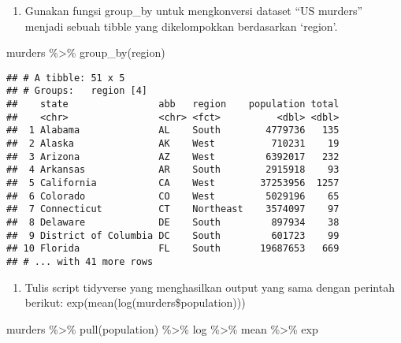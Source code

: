 \documentclass[
]{article}
\newenvironment{Shaded}{\begin{snugshade}}{\end{snugshade}}
\newcommand{\FunctionTok}[1]{\textcolor[rgb]{0.00,0.00,0.00}{#1}}
\newcommand{\NormalTok}[1]{#1}
\newcommand{\SpecialCharTok}[1]{\textcolor[rgb]{0.00,0.00,0.00}{#1}}
\providecommand{\tightlist}{%
  \setlength{\itemsep}{0pt}\setlength{\parskip}{0pt}}
\begin{document}
\begin{enumerate}
\def\labelenumi{\arabic{enumi}.}
\setcounter{enumi}{1}
\tightlist
\item
  Gunakan fungsi group\_by untuk mengkonversi dataset ``US murders''
  menjadi sebuah tibble yang dikelompokkan berdasarkan `region'.
\end{enumerate}

\begin{Shaded}
\begin{Highlighting}[]
\NormalTok{murders }\SpecialCharTok{\%\textgreater{}\%} \FunctionTok{group\_by}\NormalTok{(region)}
\end{Highlighting}
\end{Shaded}

\begin{verbatim}
## # A tibble: 51 x 5
## # Groups:   region [4]
##    state                abb   region    population total
##    <chr>                <chr> <fct>          <dbl> <dbl>
##  1 Alabama              AL    South        4779736   135
##  2 Alaska               AK    West          710231    19
##  3 Arizona              AZ    West         6392017   232
##  4 Arkansas             AR    South        2915918    93
##  5 California           CA    West        37253956  1257
##  6 Colorado             CO    West         5029196    65
##  7 Connecticut          CT    Northeast    3574097    97
##  8 Delaware             DE    South         897934    38
##  9 District of Columbia DC    South         601723    99
## 10 Florida              FL    South       19687653   669
## # ... with 41 more rows
\end{verbatim}

\begin{enumerate}
\def\labelenumi{\arabic{enumi}.}
\setcounter{enumi}{2}
\tightlist
\item
  Tulis script tidyverse yang menghasilkan output yang sama dengan
  perintah berikut: exp(mean(log(murders\$population)))
\end{enumerate}

\begin{Shaded}
\begin{Highlighting}[]
\NormalTok{murders }\SpecialCharTok{\%\textgreater{}\%} 
     \FunctionTok{pull}\NormalTok{(population) }\SpecialCharTok{\%\textgreater{}\%} 
\NormalTok{     log }\SpecialCharTok{\%\textgreater{}\%}
\NormalTok{     mean }\SpecialCharTok{\%\textgreater{}\%} 
\NormalTok{     exp}
\end{Highlighting}
\end{Shaded}
\end{document}
